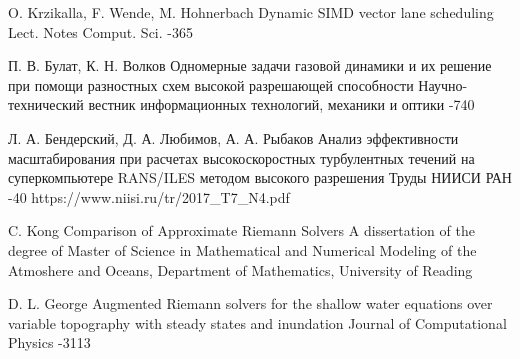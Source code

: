 \documentclass[utf8]{psta}
\begin{document}
\begin{thebibliography}{30}
\by O. Krzikalla, F. Wende, M. Hohnerbach
\paper Dynamic SIMD vector lane scheduling
\jour Lect. Notes Comput. Sci.
-365

\by П. В. Булат, К. Н. Волков
\paper Одномерные задачи газовой динамики и их решение при помощи разностных схем высокой разрешающей способности
\jour Научно-технический вестник информационных технологий, механики и оптики
-740

\by Л. А. Бендерский, Д. А. Любимов, А. А. Рыбаков
\paper Анализ эффективности масштабирования при расчетах высокоскоростных турбулентных течений на суперкомпьютере RANS/ILES методом высокого разрешения
\jour Труды НИИСИ РАН
-40
\URL https://www.niisi.ru/tr/2017_T7_N4.pdf

\by C. Kong
\thesis Comparison of Approximate Riemann Solvers
\thesisinfo A dissertation of the degree of Master of Science in Mathematical and Numerical Modeling of the Atmoshere and Oceans, Department of Mathematics, University of Reading

\by D. L. George
\paper Augmented Riemann solvers for the shallow water equations over variable topography with steady states and inundation
\jour Journal of Computational Physics
-3113

\end{thebibliography}
\end{document}
